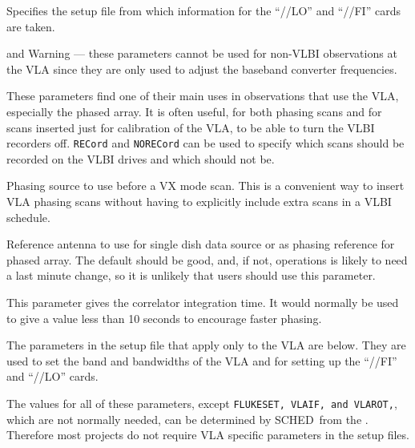 \documentclass{report}
\newcommand{\schedb}{{\sc SCHED~}}
\begin{document}
\begin{list}{}{\parsep 0em  \itemsep 0em }
\item {} Specifies the setup file from
which information for the ``//LO'' and ``//FI'' cards are taken.

\item {} and 
Warning --- these parameters cannot be used for non-VLBI observations
at the VLA since they are only used to adjust the baseband converter
frequencies.

\item {} These parameters
find one of their main uses in observations that use the VLA, especially
the phased array.  It is often useful, for both phasing scans and for
scans inserted just for calibration of the VLA, to be able to turn the
VLBI recorders off.  {\tt RECord} and {\tt NORECord} can be used
to specify which scans should be recorded on the VLBI drives and which
should not be.

\item {} Phasing source to use
before a VX mode scan.  This is a convenient way to insert VLA phasing
scans without having to explicitly include extra scans in a VLBI
schedule.

\item {} Reference antenna to use
for single dish data source or as phasing reference for phased array.
The default should be good, and, if not, operations is likely to need
a last minute change, so it is unlikely that users should use this
parameter.

\item {} This parameter gives the
correlator integration time.  It would normally be used to give a
value less than 10 seconds to encourage faster phasing.


\end{list}

The parameters in the setup file that apply only to the VLA are
below. They are used to set the band and bandwidths of the VLA and
for setting up the ``//FI'' and ``//LO''  cards.

The values for all of these parameters, except {\tt FLUKESET, VLAIF,
and VLAROT,}, which are not normally needed, can be determined by
\schedb from the .  Therefore
most projects do not require VLA specific parameters in the setup
files.
\end{document}
